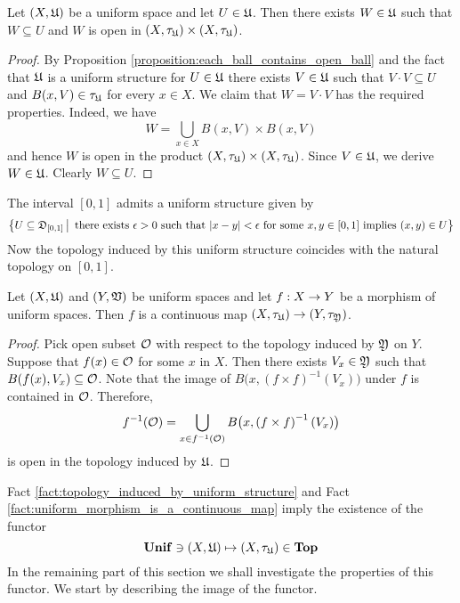 \begin{corollary}\label{corollary:each_entourage_contains_open_subset_in_square}
Let $(X,{\mathfrak U})$ be a uniform space and let $U \in {\mathfrak U}$. Then there exists $W \in {\mathfrak U}$ such that $W\subseteq U$ and $W$ is open in $\left(X,\tau_{{\mathfrak U}}\right) \times \left(X,\tau_{{\mathfrak U}}\right)$.
\end{corollary}
\begin{proof}
By Proposition \ref{proposition:each_ball_contains_open_ball} and the fact that ${\mathfrak U}$ is a uniform structure for $U \in {\mathfrak U}$ there exists $V \in {\mathfrak U}$ such that $V\cdot V\subseteq U$ and $B(x,V) \in \tau_{{\mathfrak U}}$ for every $x \in X$. We claim that $W = V\cdot V$ has the required properties. Indeed, we have
$$W = \bigcup_{x\in X}B(x,V)\times B(x,V)$$
and hence $W$ is open in the product $\left(X,\tau_{{\mathfrak U}}\right) \times \left(X,\tau_{{\mathfrak U}}\right)$. Since $V \in {\mathfrak U}$, we derive $W \in {\mathfrak U}$. Clearly $W\subseteq U$. 
\end{proof}

\begin{example}\label{example:uniform_structure_on_interval}
The interval $[0,1]$ admits a uniform structure given by
$$\big\{U\subseteq {\mathfrak D}_{[0,1]}\,\big|\,\mbox{ there exists }\epsilon > 0\mbox{ such that }|x - y| < \epsilon\mbox{ for some }x,y\in [0,1]\mbox{ implies }(x,y)\in U\big\}$$
Now the topology induced by this uniform structure coincides with the natural topology on $[0,1]$.
\end{example}

\begin{fact}\label{fact:uniform_morphism_is_a_continuous_map}
Let $(X,{\mathfrak U})$ and $(Y,{\mathfrak V})$ be uniform spaces and let $f:X\rightarrow Y$ be a morphism of uniform spaces. Then $f$ is a continuous map $\left(X,\tau_{{\mathfrak U}}\right)\rightarrow \left(Y,\tau_{{\mathfrak Y}}\right)$.
\end{fact}
\begin{proof}
Pick open subset ${\mathcal O}$ with respect to the topology induced by ${\mathfrak Y}$ on $Y$. Suppose that $f(x) \in {\mathcal O}$ for some $x$ in $X$. Then there exists $V_x \in {\mathfrak Y}$ such that $B(f(x),V_x)\subseteq {\mathcal O}$. Note that the image of $B\big(x,\left(f\times f\right)^{-1}(V_x)\big)$ under $f$ is contained in ${\mathcal O}$. Therefore,
$$f^{-1}({\mathcal O}) = \bigcup_{x\in f^{-1}({\mathcal O})}B\big(x,\left(f\times f\right)^{-1}(V_x)\big)$$
is open in the topology induced by ${\mathfrak U}$.
\end{proof}
\noindent
Fact \ref{fact:topology_induced_by_uniform_structure} and Fact \ref{fact:uniform_morphism_is_a_continuous_map} imply the existence of the functor 
$$\mathbf{Unif} \ni (X,{\mathfrak U}) \mapsto (X,\tau_{{\mathfrak U}})\in   \mathbf{Top}$$
In the remaining part of this section we shall investigate the properties of this functor. We start by describing the image of the functor.

